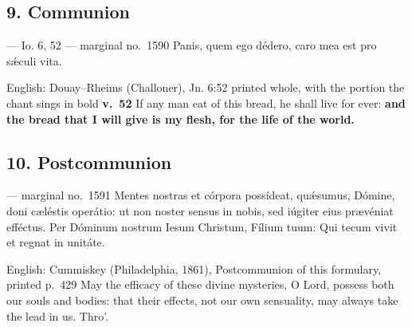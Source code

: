 \elementguard
\subsection*{9. Communion }

\begin{appointedlatin}{ --- Io. 6, 52 --- marginal no.\ 1590}
Panis, quem ego dédero, caro mea est pro sǽculi vita.
\end{appointedlatin}

\begin{namedtranslation}{English: Douay--Rheims (Challoner), Jn. 6:52 printed whole, with the portion the chant sings in bold}
\textbf{v.~52} If any man eat of this bread, he shall live for ever: \textbf{and
the bread that I will give is my flesh, for the life of the world.}
\end{namedtranslation}


\elementguard
\subsection*{10. Postcommunion }

\begin{appointedlatin}{ --- marginal no.\ 1591}
Mentes nostras et córpora possídeat, quǽsumus, Dómine, doni cæléstis operátio:
ut non noster sensus in nobis, sed iúgiter eius prævéniat efféctus. Per Dóminum
nostrum Iesum Christum, Fílium tuum: Qui tecum vivit et regnat in unitáte.
\end{appointedlatin}

\begin{namedtranslation}{English: Cummiskey (Philadelphia, 1861), Postcommunion of this formulary, printed p.~429}
May the efficacy of these divine mysteries, O Lord, possess both our souls and
bodies: that their effects, not our own sensuality, may always take the lead in
us.  Thro'.
\end{namedtranslation}

